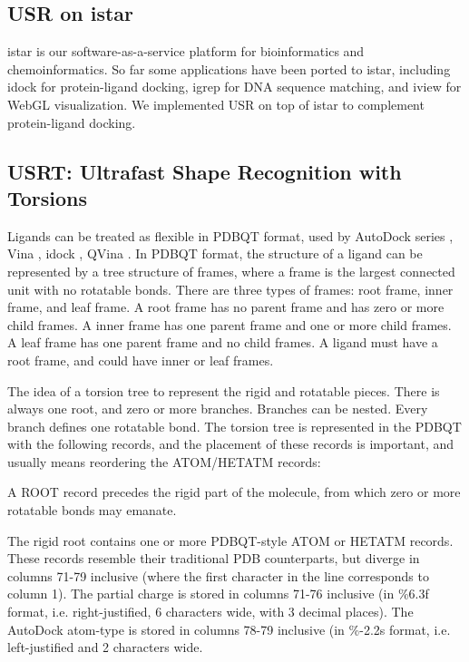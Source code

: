 \documentclass[twocolumn]{svjour3}          %
\begin{document}
\subsection{USR on istar}

istar \cite{1362} is our software-as-a-service platform for bioinformatics and chemoinformatics. So far some applications have been ported to istar, including idock \cite{1153} for protein-ligand docking, igrep \cite{1138} for DNA sequence matching, and iview \cite{1366} for WebGL visualization. We implemented USR on top of istar to complement protein-ligand docking.

\subsection{USRT: Ultrafast Shape Recognition with Torsions}

Ligands can be treated as flexible in PDBQT format, used by AutoDock series \cite{597,596}, Vina \cite{595}, idock \cite{1153}, QVina \cite{1193}. In PDBQT format, the structure of a ligand can be represented by a tree structure of frames, where a frame is the largest connected unit with no rotatable bonds. There are three types of frames: root frame, inner frame, and leaf frame. A root frame has no parent frame and has zero or more child frames. A inner frame has one parent frame and one or more child frames. A leaf frame has one parent frame and no child frames. A ligand must have a root frame, and could have inner or leaf frames.

The idea of a torsion tree to represent the rigid and rotatable pieces. There is always one root, and zero or more branches. Branches can be nested. Every branch defines one rotatable bond. The torsion tree is represented in the PDBQT with the following records, and the placement of these records is important, and usually means reordering the ATOM/HETATM records: %

A ROOT record precedes the rigid part of the molecule, from which zero or more rotatable bonds may emanate.

The rigid root contains one or more PDBQT-style ATOM or HETATM records. These records resemble their traditional PDB counterparts, but diverge in columns 71-79 inclusive (where the first character in the line corresponds to column 1). The partial charge is stored in columns 71-76 inclusive (in \%6.3f format, i.e. right-justified, 6 characters wide, with 3 decimal places). The AutoDock atom-type is stored in columns 78-79 inclusive (in \%-2.2s format, i.e. left-justified and 2 characters wide.
\end{document}
